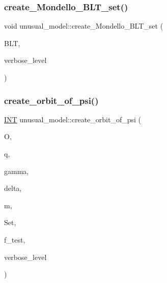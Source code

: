 \subsubsection{\texorpdfstring{create\+\_\+\+Mondello\+\_\+\+B\+L\+T\+\_\+set()}{create\_Mondello\_BLT\_set()}}
{\footnotesize\ttfamily void unusual\+\_\+model\+::create\+\_\+\+Mondello\+\_\+\+B\+L\+T\+\_\+set (\begin{DoxyParamCaption}\item[{\mbox{\hyperlink{galois_8h_a09fddde158a3a20bd2dcadb609de11dc}{I\+NT}} $\ast$}]{B\+LT,  }\item[{\mbox{\hyperlink{galois_8h_a09fddde158a3a20bd2dcadb609de11dc}{I\+NT}}}]{verbose\+\_\+level }\end{DoxyParamCaption})}

\mbox{\label{classunusual__model_a3ce621449038cd513f2af63b4d5ebda3}} 
\subsubsection{\texorpdfstring{create\+\_\+orbit\+\_\+of\+\_\+psi()}{create\_orbit\_of\_psi()}}
{\footnotesize\ttfamily \mbox{\hyperlink{galois_8h_a09fddde158a3a20bd2dcadb609de11dc}{I\+NT}} unusual\+\_\+model\+::create\+\_\+orbit\+\_\+of\+\_\+psi (\begin{DoxyParamCaption}\item[{\mbox{\hyperlink{classorthogonal}{orthogonal}} \&}]{O,  }\item[{\mbox{\hyperlink{galois_8h_a09fddde158a3a20bd2dcadb609de11dc}{I\+NT}}}]{q,  }\item[{\mbox{\hyperlink{galois_8h_a09fddde158a3a20bd2dcadb609de11dc}{I\+NT}}}]{gamma,  }\item[{\mbox{\hyperlink{galois_8h_a09fddde158a3a20bd2dcadb609de11dc}{I\+NT}}}]{delta,  }\item[{\mbox{\hyperlink{galois_8h_a09fddde158a3a20bd2dcadb609de11dc}{I\+NT}}}]{m,  }\item[{\mbox{\hyperlink{galois_8h_a09fddde158a3a20bd2dcadb609de11dc}{I\+NT}} $\ast$}]{Set,  }\item[{\mbox{\hyperlink{galois_8h_a09fddde158a3a20bd2dcadb609de11dc}{I\+NT}}}]{f\+\_\+test,  }\item[{\mbox{\hyperlink{galois_8h_a09fddde158a3a20bd2dcadb609de11dc}{I\+NT}}}]{verbose\+\_\+level }\end{DoxyParamCaption})}

